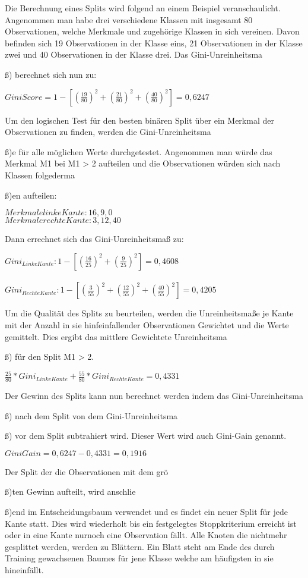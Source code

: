 Die Berechnung eines Splits wird folgend an einem Beispiel veranschaulicht.
Angenommen man habe drei verschiedene Klassen mit insgesamt 80 Observationen, welche Merkmale und zugeh{\"o}rige Klassen in sich vereinen.
Davon befinden sich 19 Observationen in der Klasse eins, 21 Observationen in der Klasse zwei und 40 Observationen in der Klasse drei. Das Gini-Unreinheitsma{\ss) berechnet sich nun zu:


$ GiniScore = \displaystyle 1- [ (\frac{19}{80})^2 + (\frac{21}{80})^2 + (\frac{40}{80})^2] = 0,6247 $


Um den logischen Test f{\"u}r den besten bin{\"a}ren Split {\"u}ber ein Merkmal der Observationen zu finden, werden die Gini-Unreinheitsma{\ss)e f{\"u}r alle m{\"o}glichen Werte durchgetestet.
Angenommen man w{\"u}rde das Merkmal M1 bei M1 > 2 aufteilen und die Observationen w{\"u}rden sich nach Klassen folgederma{\ss)en aufteilen:

$Merkmale linke Kante: 16, 9, 0$\\
$Merkmale rechte Kante : 3, 12, 40$

Dann errechnet sich das Gini-Unreinheitsma{\ss} zu:

$Gini_{Linke Kante}:    \displaystyle 1 - [ (\frac{16}{25})^2 + (\frac{9}{25})^2] = 0,4608$\\
\\
$Gini_{Rechte Kante}:   \displaystyle 1 - [ (\frac{3}{55})^2 + (\frac{12}{55})^2+ (\frac{40}{55})^2] = 0,4205$

Um die Qualit{\"a}t des Splits zu beurteilen, werden die Unreinheitsma{\ss}e je Kante mit der Anzahl in sie hinfeinfallender Observationen Gewichtet und die Werte gemittelt. 
Dies ergibt das mittlere Gewichtete Unreinheitsma{\ss) f{\"u}r den Split M1 > 2.

${ \displaystyle \frac{25}{80} * Gini_{Linke Kante} + \frac{55}{80} * Gini_{Rechte Kante} = 0,4331}$

Der Gewinn des Splits kann nun berechnet werden indem das Gini-Unreinheitsma{\ss) nach dem Split von dem Gini-Unreinheitsma{\ss) vor dem Split subtrahiert wird. Dieser Wert wird auch Gini-Gain genannt. 

$ GiniGain = \displaystyle 0,6247 - 0,4331 = 0,1916$

Der Split der die Observationen mit dem gr{\"o}{\ss)ten Gewinn aufteilt, wird anschlie{\ss)end im Entscheidungsbaum verwendet und es findet ein neuer Split f{\"u}r jede Kante statt.
Dies wird wiederholt bis ein festgelegtes Stoppkriterium erreicht ist oder in eine Kante nurnoch eine Observation f{\"a}llt. Alle Knoten die nichtmehr gesplittet werden, werden zu Bl{\"a}ttern.
Ein Blatt steht am Ende des durch Training gewachsenen Baumes f{\"u}r jene Klasse welche am h{\"a}ufigsten in sie hineinf{\"a}llt.

}}}}}}}}
